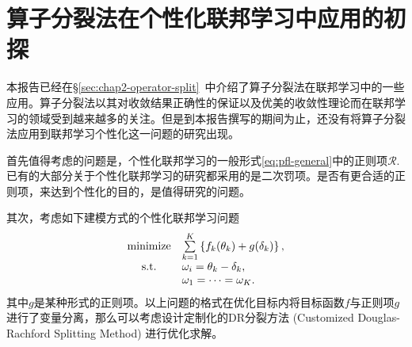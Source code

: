 \section{算子分裂法在个性化联邦学习中应用的初探}
\label{sec:chap3-pfl-os}



本报告已经在\S\ref{sec:chap2-operator-split}~中介绍了算子分裂法在联邦学习中的一些应用。算子分裂法以其对收敛结果正确性的保证\cite{pathak2020fedsplit}以及优美的收敛性理论\cite{ryu2022large}而在联邦学习的领域受到越来越多的关注。但是到本报告撰写的期间为止，还没有将算子分裂法应用到联邦学习个性化这一问题的研究出现。

首先值得考虑的问题是，个性化联邦学习的一般形式\eqref{eq:pfl-general}中的正则项$\mathcal{R}.$ 已有的大部分关于个性化联邦学习的研究\cite{hanzely2020federated, li_2021_ditto, t2020pfedme}都采用的是二次罚项。是否有更合适的正则项，来达到个性化的目的，是值得研究的问题。

其次，考虑如下建模方式的个性化联邦学习问题
\begin{equation}
\label{eq:customized-drsm}
\begin{array}{cl}
 \operatorname*{minimize} & \sum\limits_{k=1}^K \left\{ f_k(\theta_k) + g(\delta_k) \right\}, \\
 \text{s.t.} & \omega_i = \theta_k - \delta_k, \\
 & \omega_1 = \cdots = \omega_K.
\end{array}
\end{equation}
其中$g$是某种形式的正则项。以上问题的格式在优化目标内将目标函数$f$与正则项$g$进行了变量分离，那么可以考虑设计定制化的DR分裂方法 (Customized Douglas-Rachford Splitting Method)\cite{Han_2013_CDRSM} 进行优化求解。
